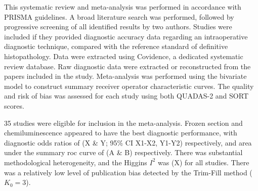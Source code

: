 
This systematic review and meta-analysis was performed in accordance with PRISMA guidelines.
A broad literature search was performed, followed by progressive screening of all identified results by two authors.
Studies were included if they provided diagnostic accuracy data regarding an intraoperative diagnostic technique, compared with the reference standard of definitive histopathology.
Data were extracted using Covidence, a dedicated systematic review database.
Raw diagnostic data were extracted or reconstructed from the papers included in the study.
Meta-analysis was performed using the bivariate model to construct summary receiver operator characteristic curves.
The quality and risk of bias was assessed for each study using both QUADAS-2 and SORT scores.


35 studies were eligible for inclusion in the meta-analysis.
Frozen section and chemiluminescence appeared to have the best diagnostic performance, with diagnostic odds ratios of (X \& Y; 95\% CI X1-X2, Y1-Y2) respectively, and area under the summary roc curve of (A \& B) respectively.
There was substantial methodological heterogeneity, and the Higgins $I^2$ was (X) for all studies.
There was a relatively low level of publication bias detected by the Trim-Fill method ($K_0 = 3$).

